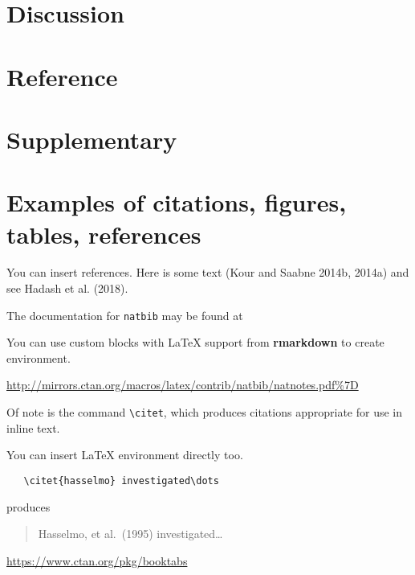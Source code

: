 \documentclass{article}
\begin{document}
\hypertarget{discussion}{%
\section{Discussion}\label{discussion}}

\hypertarget{reference}{%
\section{Reference}\label{reference}}

\hypertarget{supplementary}{%
\section{Supplementary}\label{supplementary}}

\hypertarget{examples-of-citations-figures-tables-references}{%
\section{Examples of citations, figures, tables,
references}\label{examples-of-citations-figures-tables-references}}

\label{sec:others}

You can insert references. Here is some text (Kour and Saabne 2014b,
2014a) and see Hadash et al. (2018).

The documentation for \verb+natbib+ may be found at

You can use custom blocks with LaTeX support from \textbf{rmarkdown} to
create environment.

\begin{center}
\url{http://mirrors.ctan.org/macros/latex/contrib/natbib/natnotes.pdf\%7D}

\end{center}

Of note is the command \verb+\citet+, which produces citations
appropriate for use in inline text.

You can insert LaTeX environment directly too.

\begin{verbatim}
   \citet{hasselmo} investigated\dots
\end{verbatim}

produces

\begin{quote}
  Hasselmo, et al.\ (1995) investigated\dots
\end{quote}

\begin{center}
  \url{https://www.ctan.org/pkg/booktabs}
\end{center}
\end{document}
